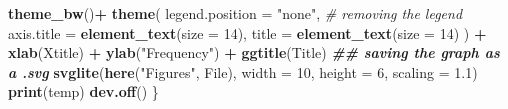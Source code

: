 \documentclass[
]{article}
\newenvironment{Shaded}{\begin{snugshade}}{\end{snugshade}}
\newcommand{\AttributeTok}[1]{\textcolor[rgb]{0.13,0.29,0.53}{#1}}
\newcommand{\CommentTok}[1]{\textcolor[rgb]{0.56,0.35,0.01}{\textit{#1}}}
\newcommand{\DecValTok}[1]{\textcolor[rgb]{0.00,0.00,0.81}{#1}}
\newcommand{\DocumentationTok}[1]{\textcolor[rgb]{0.56,0.35,0.01}{\textbf{\textit{#1}}}}
\newcommand{\FloatTok}[1]{\textcolor[rgb]{0.00,0.00,0.81}{#1}}
\newcommand{\FunctionTok}[1]{\textcolor[rgb]{0.13,0.29,0.53}{\textbf{#1}}}
\newcommand{\NormalTok}[1]{#1}
\newcommand{\SpecialCharTok}[1]{\textcolor[rgb]{0.81,0.36,0.00}{\textbf{#1}}}
\newcommand{\StringTok}[1]{\textcolor[rgb]{0.31,0.60,0.02}{#1}}
\begin{document}
\begin{Shaded}
\begin{Highlighting}[]
    \FunctionTok{theme\_bw}\NormalTok{()}\SpecialCharTok{+}
    \FunctionTok{theme}\NormalTok{(}
      \AttributeTok{legend.position =} \StringTok{"none"}\NormalTok{, }\CommentTok{\# removing the legend}
      \AttributeTok{axis.title =} \FunctionTok{element\_text}\NormalTok{(}\AttributeTok{size =} \DecValTok{14}\NormalTok{),}
      \AttributeTok{title =} \FunctionTok{element\_text}\NormalTok{(}\AttributeTok{size =} \DecValTok{14}\NormalTok{)}
\NormalTok{    ) }\SpecialCharTok{+}
    \FunctionTok{xlab}\NormalTok{(Xtitle) }\SpecialCharTok{+}
    \FunctionTok{ylab}\NormalTok{(}\StringTok{"Frequency"}\NormalTok{) }\SpecialCharTok{+}
    \FunctionTok{ggtitle}\NormalTok{(Title)}
  \DocumentationTok{\#\# saving the graph as a .svg}
  \FunctionTok{svglite}\NormalTok{(}\FunctionTok{here}\NormalTok{(}\StringTok{"Figures"}\NormalTok{, File), }\AttributeTok{width =} \DecValTok{10}\NormalTok{,}
          \AttributeTok{height =} \DecValTok{6}\NormalTok{,}
          \AttributeTok{scaling =} \FloatTok{1.1}\NormalTok{)}
  \FunctionTok{print}\NormalTok{(temp)}
  \FunctionTok{dev.off}\NormalTok{()}
\NormalTok{\}}


\end{Highlighting}
\end{Shaded}
\end{document}
